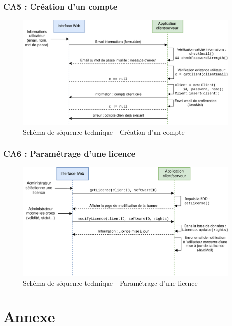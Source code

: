 \subsection{CA5 : Création d'un compte}
\begin{figure}[!h]
    \centering
    \includegraphics[width=15cm]{../png/SSD-creation-compte.png}
    \caption{Schéma de séquence technique - Création d'un compte}
\end{figure}

\subsection{CA6 : Paramétrage d'une licence}
\begin{figure}[!h]
    \centering
    \includegraphics[width=15cm]{../png/SSD-param-licence.png}
    \caption{Schéma de séquence technique - Paramétrage d'une licence}
\end{figure}
\newpage

\chapter{Annexe}
\label{chap:Annexe}


